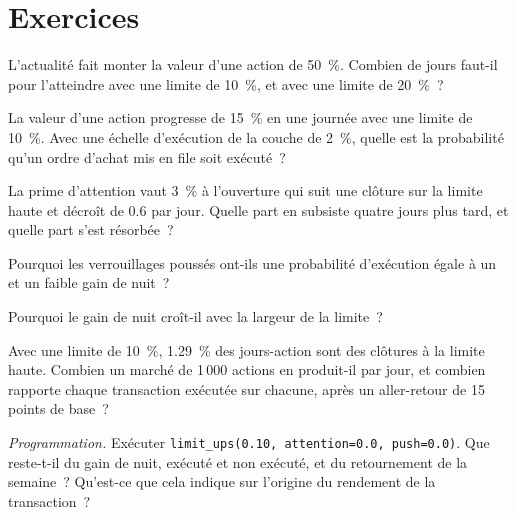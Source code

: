 \section{Exercices}

\begin{exercise}[$\star$]\label{exo:s1:asia-specific-equity-strategies:1}
L'actualité fait monter la valeur d'une action de 50~\%. Combien de jours faut-il pour l'atteindre avec une limite de 10~\%, et avec une limite de 20~\%~?
\end{exercise}

\begin{exercise}[$\star$]\label{exo:s1:asia-specific-equity-strategies:2}
La valeur d'une action progresse de 15~\% en une journée avec une limite de 10~\%. Avec une échelle d'exécution de la couche de 2~\%, quelle est la probabilité qu'un ordre d'achat mis en file soit exécuté~?
\end{exercise}

\begin{exercise}[$\star$]\label{exo:s1:asia-specific-equity-strategies:3}
La prime d'attention vaut 3~\% à l'ouverture qui suit une clôture sur la limite haute et décroît de 0.6 par jour. Quelle part en subsiste quatre jours plus tard, et quelle part
s'est résorbée~?
\end{exercise}

\begin{exercise}[$\star\star$]\label{exo:s1:asia-specific-equity-strategies:4}
Pourquoi les verrouillages poussés ont-ils une probabilité d'exécution égale à un et un faible gain de nuit~?
\end{exercise}

\begin{exercise}[$\star\star$]\label{exo:s1:asia-specific-equity-strategies:5}
Pourquoi le gain de nuit croît-il avec la largeur de la limite~?
\end{exercise}

\begin{exercise}[$\star\star$]\label{exo:s1:asia-specific-equity-strategies:6}
Avec une limite de 10~\%, 1.29~\% des jours-action sont des clôtures à la limite haute. Combien un marché de 1\,000 actions en produit-il par jour, et combien rapporte chaque transaction exécutée
sur chacune, après un aller-retour de 15 points de base~?
\end{exercise}

\begin{exercise}[$\star\star\star$]\label{exo:s1:asia-specific-equity-strategies:7}
\emph{Programmation.} Exécuter \texttt{limit\_ups(0.10, attention=0.0, push=0.0)}. Que reste-t-il du gain de nuit, exécuté et non exécuté, et du
retournement de la semaine~? Qu'est-ce que cela indique sur l'origine du rendement de la transaction~?
\end{exercise}

